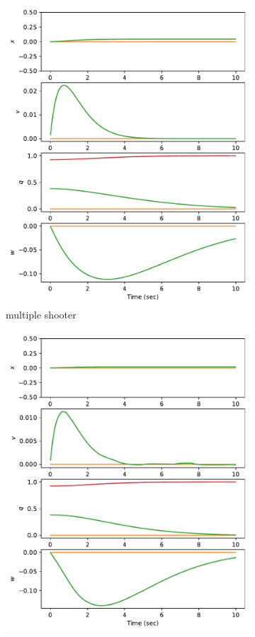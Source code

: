\documentclass[]{article}
\begin{document}
\begin{figure}[H]
\begin{subfigure}[b]{0.3\textwidth}
		\includegraphics[width=\textwidth]{state45dz3.pdf}
		\caption{multiple shooter}
	\end{subfigure}
	\begin{subfigure}[b]{0.3\textwidth}
		\centering
		\includegraphics[width=\textwidth]{state45dz2.pdf}

\end{subfigure}
\end{figure}
\end{document}
